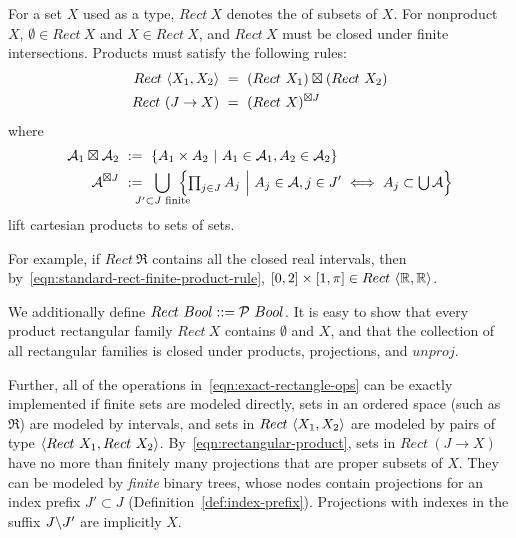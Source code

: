 \documentclass{llncs}
\begin{document}
\begin{definition}
\label{def:standard-rectangle}
For a set $X$ used as a type, $Rect~X$ denotes the  of subsets of $X$.
For nonproduct $X$, $\emptyset \in Rect~X$ and $X \in Rect~X$, and $Rect~X$ must be closed under finite intersections.
Products must satisfy the following rules:
\begin{align}
	Rect~\langle{X_1,X_2}\rangle &\ = \ (Rect~X_1) \boxtimes (Rect~X_2)
	\label{eqn:standard-rect-finite-product-rule}
\\
	Rect~(J \to X) &\ = \ (Rect~X)^{\boxtimes J}
	\label{eqn:standard-rect-arbitrary-product-rule}
\end{align}
where
\begin{align}
	\A_1 \boxtimes \A_2 &\ := \ \setb{A_1 \times A_2}{A_1 \in \A_1, A_2 \in \A_2}
\\
	\A^{\boxtimes J} &\ := \ \!\!\!\!\!\!\!\displaystyle\bigcup_{J' \subset J \text{ finite}}\!\!\!\!\!\! \left\{\textstyle\prod_{j \in J} A_j\ \middle|\ A_j \in \A, j \in J' \iff A_j \subset \U \A\right\}
\label{eqn:rectangular-product}
\end{align}
lift cartesian products to sets of sets.
\end{definition}

For example, if $Rect~\Re$ contains all the closed real intervals, then by~\eqref{eqn:standard-rect-finite-product-rule}, $[0,2] \times [1,\pi] \in Rect~\langle{\mathbb{R},\mathbb{R}}\rangle$.

We additionally define $Rect~Bool ::= \mathcal{P}~Bool$.
It is easy to show that every product rectangular family $Rect~X$ contains $\emptyset$ and $X$, and that the collection of all rectangular families is closed under products, projections, and $unproj$.

Further, all of the operations in~\eqref{eqn:exact-rectangle-ops} can be exactly implemented if finite sets are modeled directly, sets in an ordered space (such as $\Re$) are modeled by intervals, and sets in $Rect~\langle{X_1,X_2}\rangle$ are modeled by pairs of type $\langle{Rect~X_1,Rect~X_2}\rangle$.
By~\eqref{eqn:rectangular-product}, sets in $Rect~(J \to X)$ have no more than finitely many projections that are proper subsets of $X$.
They can be modeled by \emph{finite} binary trees, whose nodes contain projections for an index prefix $J' \subset  J$ (Definition~\ref{def:index-prefix}).
Projections with indexes in the suffix $J \backslash J'$ are implicitly $X$.
\end{document}
